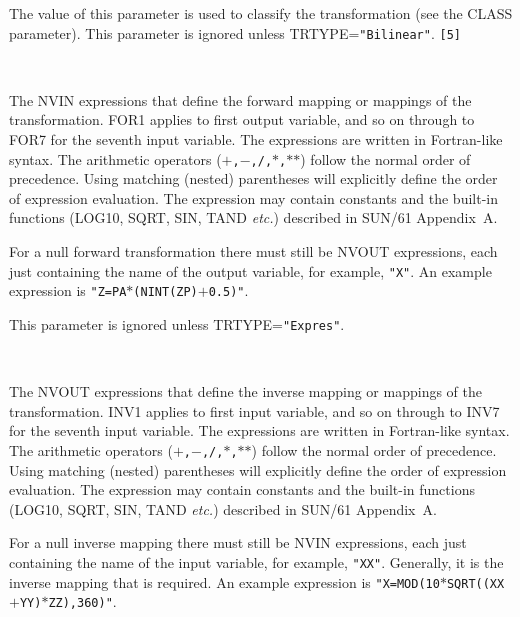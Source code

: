 \documentclass[twoside,11pt]{article}
\newcommand{\sstsubsection}[1]{ \item[{#1}] \mbox{} \\}
\newcommand{\sstsubsection}[1]{\item[{#1}]}
\begin{document}
{{{         The value of this parameter is used to classify the
         transformation (see the CLASS parameter).  This parameter is
         ignored unless TRTYPE={\tt "Bilinear"}.  {\tt [5]}
      }
      \sstsubsection{
         FOR1-FOR7 = LITERAL (Read)
      }{
         The NVIN expressions that define the forward mapping or
         mappings of the transformation.  FOR1 applies to first
         output variable, and so on through to FOR7 for the seventh
         input variable.  The expressions are written in Fortran-like
         syntax.  The arithmetic operators ({\tt $+$,$-$,/,$*$,$*$$*$})
         follow the normal order of precedence.  Using matching (nested)
         parentheses will explicitly define the order of expression
         evaluation.  The expression may contain constants and the
         built-in functions (LOG10, SQRT, SIN, TAND {\it etc.}) described in
         SUN/61 Appendix~A.

         For a null forward transformation there must still be NVOUT
         expressions, each just containing the name of the output
         variable, for example, {\tt "X"}.  An example expression is
         {\tt "Z=PA$*$(NINT(ZP)$+$0.5)"}.

         This parameter is ignored unless TRTYPE={\tt "Expres"}.
      }
      \sstsubsection{
         INV1-INV7 = LITERAL (Read)
      }{
         The NVOUT expressions that define the inverse mapping or
         mappings of the transformation.  INV1 applies to first
         input variable, and so on through to INV7 for the seventh
         input variable.  The expressions are written in Fortran-like
         syntax.  The arithmetic operators ({\tt $+$,$-$,/,$*$,$*$$*$})
         follow the normal order of precedence.  Using matching (nested)
         parentheses will explicitly define the order of expression
         evaluation.  The expression may contain constants and the
         built-in functions (LOG10, SQRT, SIN, TAND {\it etc.}) described in
         SUN/61 Appendix~A.

         For a null inverse mapping there must still be NVIN
         expressions, each just containing the name of the input
         variable, for example, {\tt "XX"}.  Generally, it is the
         inverse mapping that is required. An example expression is
         {\tt "X=MOD(10$*$SQRT((XX$+$YY)$*$ZZ),360)"}.

}}}
\end{document}
